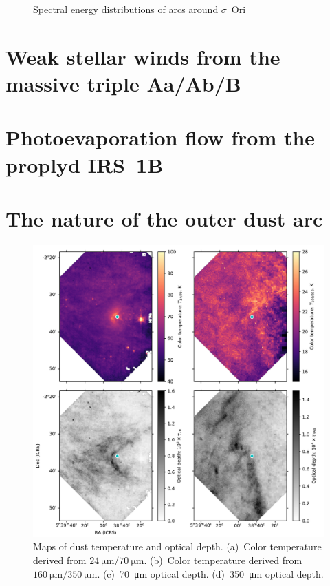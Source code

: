 \documentclass[useAMS, usenatbib, a4paper]{mnras}
\begin{document}
\begin{figure}
  \centering
  \caption{Spectral energy distributions of arcs around $\sigma$~Ori}
  \label{fig:sig-ori-SED}
\end{figure}



\section{Weak stellar winds from the massive triple Aa/Ab/B}
\label{sec:stellar-winds-AB}

\section{Photoevaporation flow from the proplyd IRS~1B}
\label{sec:phot-flow-from}

\section{The nature of the outer dust arc}

\begin{figure}
  \includegraphics[width=\linewidth]{figs/sigma-ori-multi-Tcol-tau}
  \caption{Maps of dust temperature and optical depth. (a)~Color
    temperature derived from \(\SI{24}{\um} /
    \SI{70}{\um}\). (b)~Color temperature derived from
    \(\SI{160}{\um} / \SI{350}{\um}\). (c)~\SI{70}{\um} optical
    depth. (d)~\SI{350}{\um} optical depth.}
  \label{fig:N-T-distro}
\end{figure}
\end{document}
